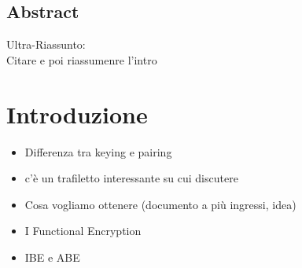 \section*{Abstract}
Ultra-Riassunto:\\
Citare \cite{kpabe} e poi riassumenre l'intro


\chapter{Introduzione}




\begin{itemize}
	\item Differenza tra keying e pairing
	\item \cite{nict} c'è un trafiletto interessante su cui discutere
	\item Cosa vogliamo ottenere (documento a più ingressi, idea)
	\item I Functional Encryption \cite{cse}
	\item IBE e ABE
\end{itemize}






 

